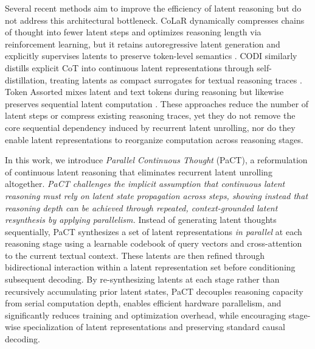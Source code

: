 Several recent methods aim to improve the efficiency of latent reasoning but do not address this architectural bottleneck. CoLaR dynamically compresses chains of thought into fewer latent steps and optimizes reasoning length via reinforcement learning, but it retains autoregressive latent generation and explicitly supervises latents to preserve token-level semantics \cite{tan2025think}. CODI similarly distills explicit CoT into continuous latent representations through self-distillation, treating latents as compact surrogates for textual reasoning traces \cite{shen2025codi}. Token Assorted mixes latent and text tokens during reasoning but likewise preserves sequential latent computation \cite{su2025token}. These approaches reduce the number of latent steps or compress existing reasoning traces, yet they do not remove the core sequential dependency induced by recurrent latent unrolling, nor do they enable latent representations to reorganize computation across reasoning stages.

In this work, we introduce \emph{Parallel Continuous Thought} (PaCT), a reformulation of continuous latent reasoning that eliminates recurrent latent unrolling altogether.
\textit{PaCT challenges the implicit assumption that continuous latent reasoning must rely on latent state propagation across steps, showing instead that reasoning depth can be achieved through repeated, context-grounded latent resynthesis by applying parallelism.}
Instead of generating latent thoughts sequentially, PaCT synthesizes a set of latent representations \emph{in parallel} at each reasoning stage using a learnable codebook of query vectors and cross-attention to the current textual context. These latents are then refined through bidirectional interaction within a latent representation set before conditioning subsequent decoding. By re-synthesizing latents at each stage rather than recursively accumulating prior latent states, PaCT decouples reasoning capacity from serial computation depth, enables efficient hardware parallelism, and significantly reduces training and optimization overhead, while encouraging stage-wise specialization of latent representations and preserving standard causal decoding.

